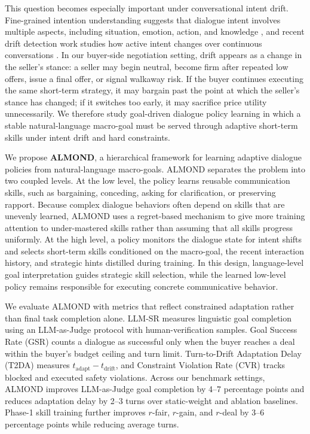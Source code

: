 \documentclass[conference]{IEEEtran}
\begin{document}
This question becomes especially important under conversational intent drift.
Fine-grained intention understanding suggests that dialogue intent involves
multiple aspects, including situation, emotion, action, and knowledge
\cite{liang-etal-2025-intentionframe}, and recent drift detection work studies
how active intent changes over continuous conversations
\cite{wang2025detecting}. In our buyer-side negotiation setting, drift appears
as a change in the seller's stance: a seller may begin neutral, become firm
after repeated low offers, issue a final offer, or signal walkaway risk. If the
buyer continues executing the same short-term strategy, it may bargain past the
point at which the seller's stance has changed; if it switches too early, it
may sacrifice price utility unnecessarily. We therefore study goal-driven
dialogue policy learning in which a stable natural-language macro-goal must be
served through adaptive short-term skills under intent drift and hard
constraints.

We propose \textbf{ALMOND}, a hierarchical framework for learning adaptive
dialogue policies from natural-language macro-goals. ALMOND separates the
problem into two coupled levels. At the low level, the policy learns reusable
communication skills, such as bargaining, conceding, asking for clarification,
or preserving rapport. Because complex dialogue behaviors often depend on
skills that are unevenly learned, ALMOND uses a regret-based mechanism to give
more training attention to under-mastered skills rather than assuming that all
skills progress uniformly. At the high level, a policy monitors the dialogue
state for intent shifts and selects short-term skills conditioned on the
macro-goal, the recent interaction history, and strategic hints distilled
during training. In this design, language-level goal interpretation guides
strategic skill selection, while the learned low-level policy remains
responsible for executing concrete communicative behavior.

We evaluate ALMOND with metrics that reflect constrained adaptation rather
than final task completion alone. LLM-SR measures linguistic goal completion
using an LLM-as-Judge protocol with human-verification samples. Goal Success
Rate (GSR) counts a dialogue as successful only when the buyer reaches a deal
within the buyer's budget ceiling and turn limit. Turn-to-Drift Adaptation
Delay (T2DA) measures $t_{\mathrm{adapt}}-t_{\mathrm{drift}}$, and Constraint
Violation Rate (CVR) tracks blocked and executed safety violations. Across our
benchmark settings, ALMOND improves LLM-as-Judge goal completion by 4--7
percentage points and reduces adaptation delay by 2--3 turns over
static-weight and ablation baselines. Phase-1 skill training further improves
$r$-fair, $r$-gain, and $r$-deal by 3--6 percentage points while reducing
average turns.
\end{document}
